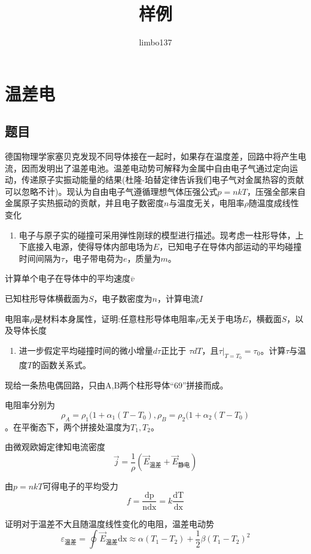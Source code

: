 \documentclass[utf8]{ctexart}
\title{样例}
\author{limbo137}
\begin{document}
\section{温差电}
\subsection{题目}
德国物理学家塞贝克发现不同导体接在一起时，如果存在温度差，回路中将产生电流，因而发明出了温差电池。温差电动势可解释为金属中自由电子气通过定向运动，传递原子实振动能量的结果(杜隆-珀替定律告诉我们电子气对金属热容的贡献可以忽略不计)。现认为自由电子气遵循理想气体压强公式$p=nkT$，压强全部来自金属原子实热振动的贡献，并且电子数密度$n$与温度无关，电阻率$\rho$随温度成线性变化

\begin{enumerate}
\def\labelenumi{(\arabic{enumi})}
\item
  电子与原子实的碰撞可采用弹性刚球的模型进行描述。现考虑一柱形导体，上下底接入电源，使得导体内部电场为$E$，已知电子在导体内部运动的平均碰撞时间间隔为\(\tau\)，电子带电荷为$e$，质量为$m$。
\end{enumerate}


计算单个电子在导体中的平均速度\(\overline{v}\)

已知柱形导体横截面为$S$，电子数密度为$n$，计算电流$I$

电阻率\(\rho\)是材料本身属性，证明:任意柱形导体电阻率\(\rho\)无关于电场$E$，横截面$S$，以及导体长度


\begin{enumerate}
\def\labelenumi{(\arabic{enumi})}
\setcounter{enumi}{1}
\item
  进一步假定平均碰撞时间的微小增量\(d\tau\)正比于
  \(\tau dT\)，且\(\tau\vert _{T=T_0}=\tau_0\)。计算\(\tau\)与温度\(T\)的函数关系式。
\end{enumerate}

现给一条热电偶回路，只由A,B两个柱形导体“$69$”拼接而成。

电阻率分别为\[\rho_{A} = \rho_{1}(1 + \alpha_{1}\left( T - T_{0} \right), \rho_{B} = \rho_{2}(1 + \alpha_{2}\left( T - T_{0} \right)\]。在平衡态下，两个拼接处温度为\(T_1,T_2\)。

由微观欧姆定律知电流密度\[\overrightarrow{j} = \frac{1}{\rho}({\overrightarrow{E}}_\text{温差} + {\overrightarrow{E}}_\text{静电})\]

由\(p = nkT\)可得电子的平均受力\[f = \frac{\text{dp}}{\text{ndx}} = k\frac{\text{dT}}{\text{dx}}\]

证明对于温差不大且随温度线性变化的电阻，温差电动势\[\varepsilon_\text{温差} = \oint_{}^{}{{\overrightarrow{E}}_\text{温差}\text{dx}} \approx \alpha\left( T_{1} - T_{2} \right) + \frac{1}{2}\beta\left( T_{1} - T_{2} \right)^{2}\]
\end{document}

